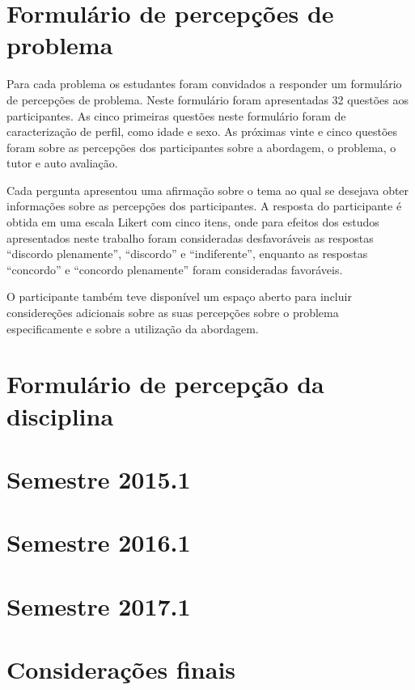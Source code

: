 \acresetall
\section{Formulário de percepções de problema}
Para cada problema os estudantes foram convidados a responder um formulário de percepções de problema.
Neste formulário foram apresentadas 32 questões aos participantes.
As cinco primeiras questões neste formulário foram de caracterização de perfil, como
idade e sexo.
As próximas vinte e cinco questões foram sobre as percepções dos participantes sobre a abordagem, o
problema, o tutor e auto avaliação.

Cada pergunta apresentou uma afirmação sobre o tema ao qual se desejava obter informações sobre as
percepções dos participantes.
A resposta do participante é obtida em uma escala Likert com cinco itens, onde para efeitos dos estudos
apresentados neste trabalho foram consideradas desfavoráveis
as respostas ``discordo plenamente'', ``discordo'' e ``indiferente'', enquanto as
respostas ``concordo'' e ``concordo plenamente'' foram consideradas favoráveis.

O participante também teve disponível um espaço aberto para incluir considereções adicionais sobre
as suas percepções sobre o problema especificamente e sobre a utilização da abordagem.

\section{Formulário de percepção da disciplina}
\section{Semestre 2015.1}
\section{Semestre 2016.1}
\section{Semestre 2017.1}
\section{Considerações finais}
